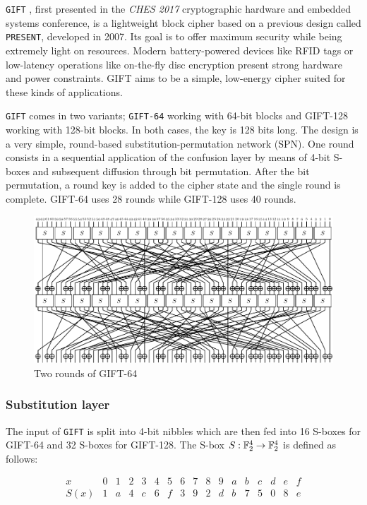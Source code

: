 \texttt{GIFT} \cite{gift:2017}, first presented in the \textit{CHES 2017}
cryptographic hardware and embedded systems conference, is a lightweight block
cipher based on a previous design called \texttt{PRESENT}, developed in 2007. Its
goal is to offer maximum security while being extremely light on resources.
Modern battery-powered devices like RFID tags or low-latency operations like
on-the-fly disc encryption present strong hardware and power constraints. GIFT
aims to be a simple, low-energy cipher suited for these kinds of applications.

\texttt{GIFT} comes in two variants; \verb|GIFT-64| working with 64-bit blocks
and GIFT-128 working with 128-bit blocks. In both cases, the key is 128
bits long. The design is a very simple, round-based substitution-permutation
network (SPN). One round consists in a sequential application of the confusion
layer by means of 4-bit S-boxes and subsequent diffusion through bit
permutation. After the bit permutation, a round key is added to the cipher
state and the single round is complete. GIFT-64 uses 28 rounds while
GIFT-128 uses 40 rounds.

\begin{figure}[h!]
    \centering
    \includegraphics[width=\textwidth]{Figures/GIFT-64.pdf}
    \caption{Two rounds of GIFT-64}
\end{figure}

\subsubsection{Substitution layer}

The input of \texttt{GIFT} is split into 4-bit nibbles which are then fed into
16 S-boxes for GIFT-64 and 32 S-boxes for GIFT-128. The S-box
$S:\mathbb{F}_2^{4}\rightarrow \mathbb{F}_2^{4}$ is defined as follows:

\[
    \begin{array}{l|cccccccccccccccc}
        x & 0 & 1 & 2 & 3 & 4 & 5 & 6 & 7 & 8 & 9 & a & b & c & d & e & f \\
        \hline
        S(x) & 1 & a & 4 & c & 6 & f & 3 & 9 & 2 & d & b & 7 & 5 & 0 & 8 & e
    \end{array}
\]


